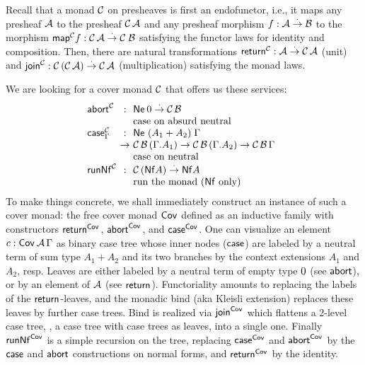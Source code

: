 \documentclass[sigplan,screen]{acmart}
\begin{document}
Recall that a monad $\C$ on presheaves is first an endofunctor,
i.e., it maps any presheaf $\A$ to the presheaf $\C\,\A$ and any
presheaf morphism $f : \A \todot \B$ to the morphism
$\tmap[\C]f: \C\,\A \todot \C\;\B$ satisfying the functor laws for
identity and composition.  Then, there are natural transformations
$\treturn[\C] : \A \todot \C\,\A$ (unit) and
$\tjoin[\C] : \C\,(\C\,\A) \todot \C\,\A$ (multiplication)
satisfying
the monad laws.

We are looking for a cover monad $\C$ that
offers us these services:
\[
\begin{array}{l@{~}c@{~}l@{\quad}l}
\tabort^\C & : & \tNe\, \tyzero \todot \C\,\B
\\ &
  & \mbox{case on absurd neutral} \\
\tcase^\C_\Gamma & : & \Ne {(A_1 + A_2)} \Gamma
\\
  &\to& \C\,\B\,(\cext \Gamma {A_1})
  \to \C\,\B\,(\cext \Gamma {A_2})
  \to \C\,\B\,\Gamma
\\ &
  & \mbox{case on neutral} \\
\trunNf[\C] & : & \C\,(\tNf A) \todot \tNf A
\\ &
  & \mbox{run the monad ($\tNf$ only)} \\
\end{array}
\]
To make things concrete,
we shall immediately construct an instance of such a cover monad:
the free cover monad
$\Cov$ defined
as an inductive family with constructors
$\treturn[\Cov]$, $\tabort^{\Cov}$, and
$\tcase^{\Cov}$.  One can visualize an element $c : \Cov\,\A\,\Gamma$ as
binary case tree whose inner nodes ($\tcase$) are labeled by a neutral term
of sum type $A_1+A_2$ and its two branches by the context extensions $A_1$
and $A_2$, resp.  Leaves are either
labeled by a neutral term of empty type $\tyzero$ (see $\tabort$),
or by an element of $\A$ (see $\treturn$).  Functoriality amounts to
replacing the labels of the $\treturn$-leaves, and the monadic bind
(aka Kleisli extension) replaces
these leaves by further case trees.  Bind is realized via $\tjoin[\Cov]$
which flattens a 2-level case tree, \ie, a case tree with case trees as
leaves, into a single one.
Finally $\trunNf[\Cov]$ is a simple recursion on the tree, replacing $\tcase^{\Cov}$
and $\tabort^{\Cov}$
by the $\tcase$ and $\tabort$ constructions on normal forms, and
$\treturn[\Cov]$ by the identity.
\end{document}
